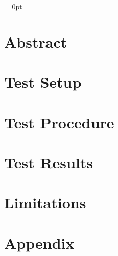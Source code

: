\documentclass[12pt]{article}
\begin{document}


\parindent = 0pt

\tableofcontents

\newpage

\section{Abstract}


\newpage

\section{Test Setup}


\newpage

\section{Test Procedure}


\newpage

\section{Test Results}




%
%

\newpage

\section{Limitations}


\newpage

\section{Appendix}

\end{document}
